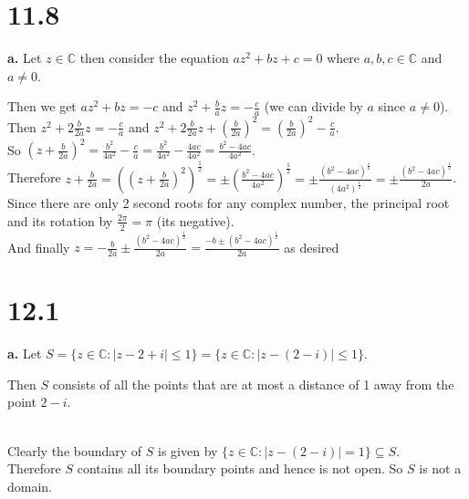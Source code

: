 \documentclass{article}
\begin{document}
\section*{11.8}

{\Large\textbf{a.}} Let $z\in\mathbb{C}$ then consider the equation $a z^2 + b z + c = 0$ where $a, b, c\in\mathbb{C}$ and $a\neq 0$.
\begin{center}
    \doublespacing
    Then we get $a z^2 + b z = -c$ and $z^2 +\frac{b}{a} z = -\frac{c}{a}$ (we can divide by $a$ since $a\neq 0$).
    \\Then $z^2 + 2\frac{b}{2a} z = -\frac{c}{a}$ and  $z^2 + 2\frac{b}{2a} z + (\frac{b}{2a})^2= (\frac{b}{2a})^2 -\frac{c}{a}$.
    \\So $(z +\frac{b}{2a})^2 =\frac{b^2}{4a^2} -\frac{c}{a} =\frac{b^2}{4a^2} -\frac{4ac}{4a^2} =\frac{b^2 - 4ac}{4a^2}$.
    \\Therefore $z +\frac{b}{2a} = ((z +\frac{b}{2a})^2)^{\frac{1}{2}} =\pm (\frac{b^2 - 4ac}{4a^2})^{\frac{1}{2}} =\pm\frac{(b^2 - 4ac)^{\frac{1}{2}}}{(4a^2)^{\frac{1}{2}}} =\pm\frac{(b^2 - 4ac)^{\frac{1}{2}}}{2a}$.
    \\Since there are only 2 second roots for any complex number, the principal root and its rotation by $\frac{2\pi}{2} =\pi$ (its negative).
    \\And finally $z = -\frac{b}{2a}\pm\frac{(b^2 - 4ac)^{\frac{1}{2}}}{2a} =\frac{- b\pm(b^2 - 4ac)^{\frac{1}{2}}}{2a}$ as desired \qedsymbol
\end{center}


\newpage
\section*{12.1}

{\Large\textbf{a.}} Let $S =\{z\in\mathbb{C}: |z - 2 + i|\leq 1\} =\{z\in\mathbb{C}: |z - (2 - i)|\leq 1\}$.
\begin{center}
    \doublespacing
    Then $S$ consists of all the points that are at most a distance of 1 away from the point $2 - i$.
    \break
    \\Clearly the boundary of $S$ is given by $\{z\in\mathbb{C}: |z - (2 - i)| = 1\}\subseteq S$.
    \\Therefore $S$ contains all its boundary points and hence is not open. So $S$ is not a domain.
\end{center}
\end{document}
